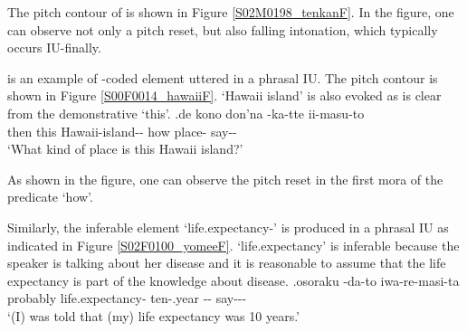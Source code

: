 The pitch contour of \Last is shown in Figure \ref{S02M0198_tenkanF}.
In the figure,
one can observe not only a pitch reset,
but also falling intonation,
which typically occurs IU-finally.

\Next is an example of -coded element uttered in a phrasal IU.
The pitch contour is shown in Figure \ref{S00F0014_hawaiiF}.
 `Hawaii island' is also evoked
as is clear from the demonstrative  `this'.
%
\exg.\label{S00F0014_hawaii}de kono \tp{\dvline}  \tp{\dvline} don'na -ka-tte ii-masu-to \tp{\dvline} \\
		then this {} Hawaii-island-- {} how place- say-- {} \\
		`What kind of place is this Hawaii island?'

As shown in the figure,
one can observe the pitch reset in the first mora of the predicate  `how'.

Similarly,
the inferable element  `life.expectancy-' is produced in a phrasal IU as indicated in Figure \ref{S02F0100_yomeeF}.
 `life.expectancy' is inferable
because the speaker is talking about her disease and
it is reasonable to assume that the life expectancy is part of the knowledge about disease.
%
\exg.\label{S02F0100_yomee}osoraku {\iub}  {\iub}  {\iub} -da-to {\iub} iwa-re-masi-ta \\
      probably {} life.expectancy- {} ten-.year {} -- {} say--- \\
      `(I) was told that (my) life expectancy was 10 years.'


